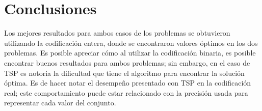 \documentclass[letterpaper,12pt]{article}
\theoremstyle{definition}
\begin{document}
\section{Conclusiones}

Los mejores resultados para ambos casos de los problemas se obtuvieron utilizando la codificación entera, donde se encontraron valores óptimos en los dos problemas. Es posible apreciar cómo al utilizar la codificación binaria, es posible encontrar buenos resultados para ambos problemas; sin embargo, en el caso de TSP es notoria la dificultad que tiene el algoritmo para encontrar la solución óptima. Es de hacer notar el desempeño presentado con TSP en la codificación real; este comportamiento puede estar relacionado con la precisión usada para representar cada valor del conjunto.



\end{document}
